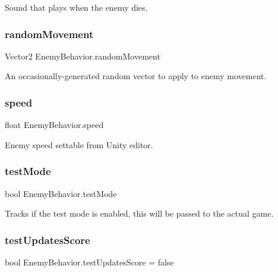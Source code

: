 Sound that plays when the enemy dies. 

\mbox{\label{class_enemy_behavior_a6f9339ebbcc8c5ad4e538d52bfde73c1}} 
\subsubsection{\texorpdfstring{randomMovement}{randomMovement}}
{\footnotesize\ttfamily Vector2 Enemy\+Behavior.\+random\+Movement}



An occasionally-\/generated random vector to apply to enemy movement. 

\mbox{\label{class_enemy_behavior_a1c7f38d162cec582d736b2b7d7d0ac6b}} 
\subsubsection{\texorpdfstring{speed}{speed}}
{\footnotesize\ttfamily float Enemy\+Behavior.\+speed}



Enemy speed settable from Unity editor. 

\mbox{\label{class_enemy_behavior_af8c760cde02386745dc1017af509049d}} 
\subsubsection{\texorpdfstring{testMode}{testMode}}
{\footnotesize\ttfamily bool Enemy\+Behavior.\+test\+Mode}



Tracks if the test mode is enabled, this will be passed to the actual game. 

\mbox{\label{class_enemy_behavior_a45bada468af071f8ff4ff0f8b6d5a443}} 
\subsubsection{\texorpdfstring{testUpdatesScore}{testUpdatesScore}}
{\footnotesize\ttfamily bool Enemy\+Behavior.\+test\+Updates\+Score = false}



